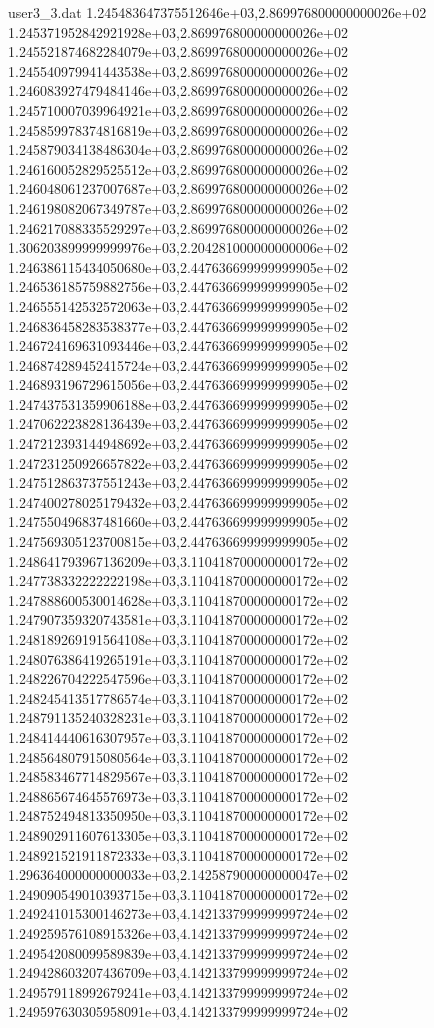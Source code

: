 \begin{filecontents}{user3_3.dat}
1.245483647375512646e+03,2.869976800000000026e+02
1.245371952842921928e+03,2.869976800000000026e+02
1.245521874682284079e+03,2.869976800000000026e+02
1.245540979941443538e+03,2.869976800000000026e+02
1.246083927479484146e+03,2.869976800000000026e+02
1.245710007039964921e+03,2.869976800000000026e+02
1.245859978374816819e+03,2.869976800000000026e+02
1.245879034138486304e+03,2.869976800000000026e+02
1.246160052829525512e+03,2.869976800000000026e+02
1.246048061237007687e+03,2.869976800000000026e+02
1.246198082067349787e+03,2.869976800000000026e+02
1.246217088335529297e+03,2.869976800000000026e+02
1.306203899999999976e+03,2.204281000000000006e+02
1.246386115434050680e+03,2.447636699999999905e+02
1.246536185759882756e+03,2.447636699999999905e+02
1.246555142532572063e+03,2.447636699999999905e+02
1.246836458283538377e+03,2.447636699999999905e+02
1.246724169631093446e+03,2.447636699999999905e+02
1.246874289452415724e+03,2.447636699999999905e+02
1.246893196729615056e+03,2.447636699999999905e+02
1.247437531359906188e+03,2.447636699999999905e+02
1.247062223828136439e+03,2.447636699999999905e+02
1.247212393144948692e+03,2.447636699999999905e+02
1.247231250926657822e+03,2.447636699999999905e+02
1.247512863737551243e+03,2.447636699999999905e+02
1.247400278025179432e+03,2.447636699999999905e+02
1.247550496837481660e+03,2.447636699999999905e+02
1.247569305123700815e+03,2.447636699999999905e+02
1.248641793967136209e+03,3.110418700000000172e+02
1.247738332222222198e+03,3.110418700000000172e+02
1.247888600530014628e+03,3.110418700000000172e+02
1.247907359320743581e+03,3.110418700000000172e+02
1.248189269191564108e+03,3.110418700000000172e+02
1.248076386419265191e+03,3.110418700000000172e+02
1.248226704222547596e+03,3.110418700000000172e+02
1.248245413517786574e+03,3.110418700000000172e+02
1.248791135240328231e+03,3.110418700000000172e+02
1.248414440616307957e+03,3.110418700000000172e+02
1.248564807915080564e+03,3.110418700000000172e+02
1.248583467714829567e+03,3.110418700000000172e+02
1.248865674645576973e+03,3.110418700000000172e+02
1.248752494813350950e+03,3.110418700000000172e+02
1.248902911607613305e+03,3.110418700000000172e+02
1.248921521911872333e+03,3.110418700000000172e+02
1.296364000000000033e+03,2.142587900000000047e+02
1.249090549010393715e+03,3.110418700000000172e+02
1.249241015300146273e+03,4.142133799999999724e+02
1.249259576108915326e+03,4.142133799999999724e+02
1.249542080099589839e+03,4.142133799999999724e+02
1.249428603207436709e+03,4.142133799999999724e+02
1.249579118992679241e+03,4.142133799999999724e+02
1.249597630305958091e+03,4.142133799999999724e+02

\end{filecontents}
